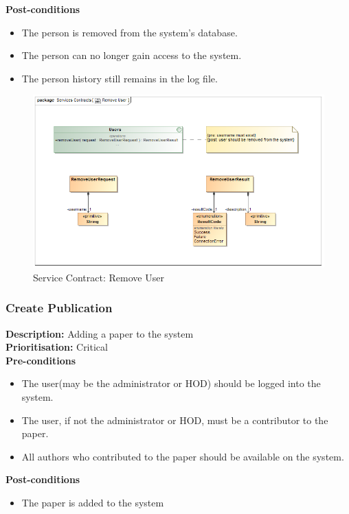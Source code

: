 \documentclass[a4paper]{article}
\begin{document}
    \textbf{Post-conditions}
    \begin{itemize}
        \item The person is removed from the system's database.
        \item The person can no longer gain access to the system.
        \item The person history still remains in the log file.
    \end{itemize}

    	\begin{figure}[H]
    		\centering
    		\includegraphics[width=\textwidth]{5.1.4.Remove.User.Services.Contract.png}
    		\caption{Service Contract: Remove User}
    	\end{figure}
\pagebreak
    \subsubsection{Create Publication}
    
    \textbf{Description:} Adding a paper to the system\\
    \textbf{Prioritisation:} Critical\\
    
    
    \textbf{Pre-conditions}
     \begin{itemize}
        \item The user(may be the administrator or HOD) should be logged into the system.
        \item The user, if not the administrator or HOD, must be a contributor to the paper.
        \item All authors who contributed to the paper should be available on the system.
   \end{itemize}
    
    \textbf{Post-conditions}
    \begin{itemize}
        \item The paper is added to the system
    \end{itemize}
    
\end{document}
